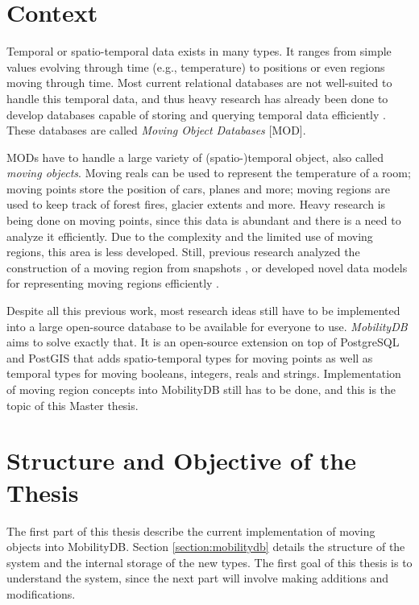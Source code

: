 
\section{Context}

Temporal or spatio-temporal data exists in many types. It ranges from simple values evolving through time (e.g., temperature) to positions or even regions moving through time. Most current relational databases are not well-suited to handle this temporal data, and thus heavy research has already been done to develop databases capable of storing and querying temporal data efficiently \cite{moving_obj_databases}. These databases are called \textit{Moving Object Databases} [MOD].

MODs have to handle a large variety of (spatio-)temporal object, also called \textit{moving objects}. Moving reals can be used to represent the temperature of a room; moving points store the position of cars, planes and more; moving regions are used to keep track of forest fires, glacier extents and more. Heavy research is being done on moving points, since this data is abundant and there is a need to analyze it efficiently. Due to the complexity and the limited use of moving regions, this area is less developed. Still, previous research analyzed the construction of a moving region from snapshots \cite{repr_from_obs,high_quality_interpol}, or developed novel data models for representing moving regions efficiently \cite{polyhedra,fmregion}.

Despite all this previous work, most research ideas still have to be implemented into a large open-source database to be available for everyone to use. \textit{MobilityDB} \cite{mobilitydb} aims to solve exactly that. It is an open-source extension on top of PostgreSQL \cite{postgresql} and PostGIS \cite{postgis} that adds spatio-temporal types for moving points as well as temporal types for moving booleans, integers, reals and strings. Implementation of moving region concepts into MobilityDB still has to be done, and this is the topic of this Master thesis.

\section{Structure and Objective of the Thesis}

The first part of this thesis describe the current implementation of moving objects into MobilityDB. Section \ref{section:mobilitydb} details the structure of the system and the internal storage of the new types. The first goal of this thesis is to understand the system, since the next part will involve making additions and modifications.

